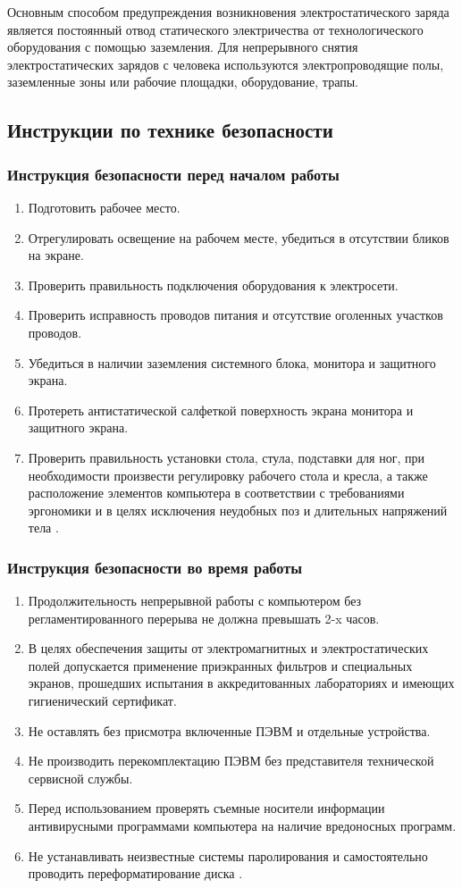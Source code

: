 Основным способом предупреждения возникновения электростатического заряда является постоянный отвод статического электричества от технологического оборудования с помощью заземления. Для непрерывного снятия электростатических зарядов с человека используются электропроводящие полы, заземленные зоны или рабочие площадки, оборудование, трапы.

\subsection{Инструкции по технике безопасности}
\subsubsection{Инструкция безопасности перед началом работы}
\begin{enumerate}
\item Подготовить рабочее место.
\item Отрегулировать освещение на рабочем месте, убедиться в отсутствии бликов на экране.
\item Проверить правильность подключения оборудования к электросети.
\item Проверить исправность проводов питания и отсутствие оголенных участков проводов.
\item Убедиться в наличии заземления системного блока, монитора и защитного экрана.
\item Протереть антистатической салфеткой поверхность экрана монитора и защитного экрана.
\item Проверить правильность установки стола, стула, подставки для ног, при необходимости произвести регулировку рабочего стола и кресла, а также расположение элементов компьютера в соответствии с требованиями эргономики и в целях исключения неудобных поз и длительных напряжений тела \cite{bhzd_3}.
\end{enumerate}

\subsubsection{Инструкция безопасности во время работы}
\begin{enumerate}
\item Продолжительность непрерывной работы с компьютером без регламентированного перерыва не должна превышать 2-x часов.
\item В целях обеспечения защиты от электромагнитных и электростатических полей допускается применение приэкранных фильтров и специальных экранов, прошедших испытания в аккредитованных лабораториях и имеющих гигиенический сертификат.
\item Не оставлять без присмотра включенные ПЭВМ и отдельные устройства.
\item Не производить перекомплектацию ПЭВМ без представителя технической сервисной службы.
\item Перед использованием проверять съемные носители информации антивирусными программами компьютера на наличие вредоносных программ.
\item Не устанавливать неизвестные системы паролирования и самостоятельно проводить переформатирование диска \cite{bhzd_3}.
\end{enumerate}

